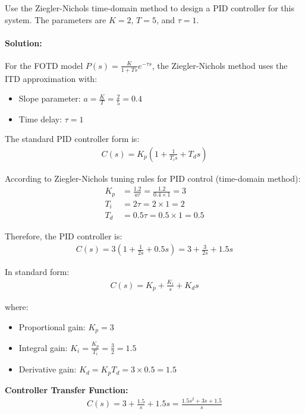\documentclass[11pt,a4paper]{article}
\begin{document}
Use the Ziegler-Nichols time-domain method to design a PID controller for this system. The parameters are $K = 2$, $T = 5$, and $\tau = 1$.

\paragraph{Solution:}

For the FOTD model $P(s) = \frac{K}{1+Ts}e^{-\tau s}$, the Ziegler-Nichols method uses the ITD approximation with:
\begin{itemize}
\item Slope parameter: $a = \frac{K}{T} = \frac{2}{5} = 0.4$
\item Time delay: $\tau = 1$
\end{itemize}

The standard PID controller form is:
\begin{align}
C(s) = K_p\left(1 + \frac{1}{T_i s} + T_d s\right)
\end{align}

According to Ziegler-Nichols tuning rules for PID control (time-domain method):
\begin{align}
K_p &= \frac{1.2}{a\tau} = \frac{1.2}{0.4 \times 1} = 3 \\
T_i &= 2\tau = 2 \times 1 = 2 \\
T_d &= 0.5\tau = 0.5 \times 1 = 0.5
\end{align}

Therefore, the PID controller is:
\begin{align}
C(s) = 3\left(1 + \frac{1}{2s} + 0.5s\right) = 3 + \frac{3}{2s} + 1.5s
\end{align}

In standard form:
\begin{align}
C(s) = K_p + \frac{K_i}{s} + K_d s
\end{align}

where:
\begin{itemize}
\item Proportional gain: $K_p = 3$
\item Integral gain: $K_i = \frac{K_p}{T_i} = \frac{3}{2} = 1.5$
\item Derivative gain: $K_d = K_p T_d = 3 \times 0.5 = 1.5$
\end{itemize}

\textbf{Controller Transfer Function:}
\begin{align}
C(s) = 3 + \frac{1.5}{s} + 1.5s = \frac{1.5s^2 + 3s + 1.5}{s}
\end{align}
\end{document}
